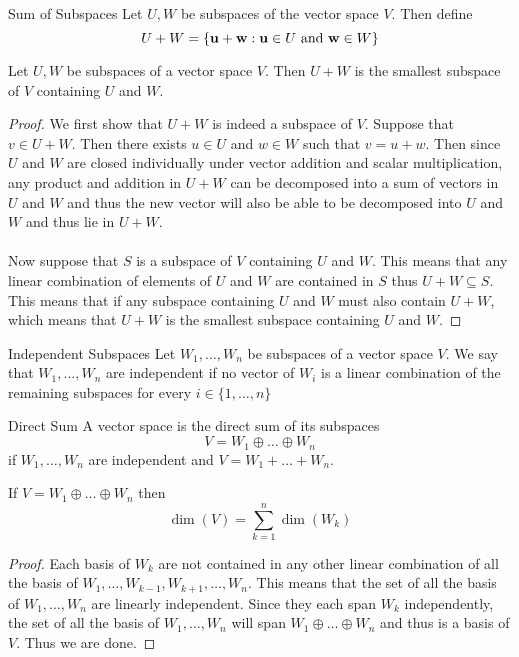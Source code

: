 \documentclass[a4paper]{article}
\begin{document}
\begin{defn}{Sum of Subspaces}{} Let $U,W$ be subspaces of the vector space $V$. Then define $$U+W=\{\vb{u}+\vb{w}:\vb{u}\in U\text{ and }\vb{w}\in W\}$$
\end{defn}

\begin{prp}{}{} Let $U,W$ be subspaces of a vector space $V$. Then $U+W$ is the smallest subspace of $V$ containing $U$ and $W$. \tcbline
\begin{proof}
We first show that $U+W$ is indeed a subspace of $V$. Suppose that $v\in U+W$. Then there exists $u\in U$ and $w\in W$ such that $v=u+w$. Then since $U$ and $W$ are closed individually under vector addition and scalar multiplication, any product and addition in $U+W$ can be decomposed into a sum of vectors in $U$ and $W$ and thus the new vector will also be able to be decomposed into $U$ and $W$ and thus lie in $U+W$. \\~\\
Now suppose that $S$ is a subspace of $V$ containing $U$ and $W$. This means that any linear combination of elements of $U$ and $W$ are contained in $S$ thus $U+W\subseteq S$. This means that if any subspace containing $U$ and $W$ must also contain $U+W$, which means that $U+W$ is the smallest subspace containing $U$ and $W$. 
\end{proof}
\end{prp}

\begin{defn}{Independent Subspaces}{} Let $W_1,\dots,W_n$ be subspaces of a vector space $V$. We say that $W_1,\dots,W_n$ are independent if no vector of $W_i$ is a linear combination of the remaining subspaces for every $i\in\{1,\dots,n\}$
\end{defn}

\begin{defn}{Direct Sum}{} A vector space is the direct sum of its subspaces $$V=W_1\oplus\dots\oplus W_n$$ if $W_1,\dots,W_n$ are independent and $V=W_1+\dots+W_n$. 
\end{defn}

\begin{crl}{}{} If $V=W_1\oplus\dots\oplus W_n$ then $$\dim(V)=\sum_{k=1}^n\dim(W_k)$$ \tcbline
\begin{proof}
Each basis of $W_k$ are not contained in any other linear combination of all the basis of $W_1,\dots,W_{k-1},W_{k+1},\dots,W_n$. This means that the set of all the basis of $W_1,\dots,W_n$ are linearly independent. Since they each span $W_k$ independently, the set of all the basis of $W_1,\dots,W_n$ will span $W_1\oplus\dots\oplus W_n$ and thus is a basis of $V$. Thus we are done. 
\end{proof}
\end{crl}
\end{document}
